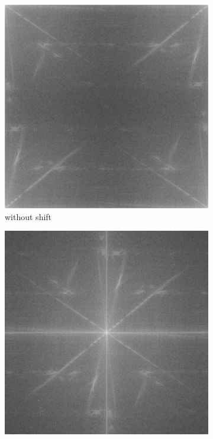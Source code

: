 \documentclass[
	12pt, %
]{style/fphw}
\begin{document}
\begin{figure}[H]
     \centering
     \begin{subfigure}[b]{0.3\textwidth}
         \centering
         \includegraphics[width=\textwidth]{Q5_1_spectrum_noshift.png}
         \caption{without shift}
         \label{Q5_2_lowpass_30_error.tif}
     \end{subfigure}
     \hfill
     \begin{subfigure}[b]{0.3\textwidth}
         \centering
         \includegraphics[width=\textwidth]{Q5_1_spectrum.png}

\end{subfigure}
\end{figure}
\end{document}
